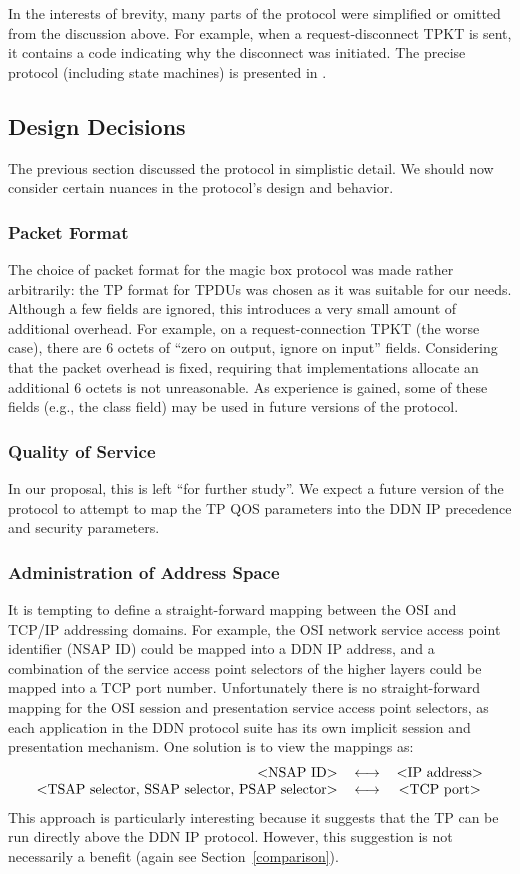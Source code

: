 In the interests of brevity,
many parts of the protocol were simplified or omitted from the discussion
above.
For example,
when a request-disconnect TPKT is sent,
it contains a code indicating why the disconnect was initiated.
The precise protocol (including state machines) is presented in
\cite{TSAP.on.TCP.old}.

\subsection	{Design Decisions}
The previous section discussed the protocol in simplistic detail.
We should now consider certain nuances in the protocol's design and behavior.

\subsubsection	{Packet Format}
The choice of packet format for the magic box protocol was made rather arbitrarily:
the TP format for TPDUs was chosen as it was suitable for our needs.
Although a few fields are ignored,
this introduces a very small amount of additional overhead.
For example,
on a request-connection TPKT (the worse case),
there are 6 octets of ``zero on output, ignore on input'' fields.
Considering that the packet overhead is fixed,
requiring that implementations allocate an additional 6 octets is not
unreasonable.
As experience is gained,
some of these fields (e.g., the class field) may be used in future versions
of the protocol.

\subsubsection	{Quality of Service}
In our proposal, this is left ``for further study''.
We expect a future version of the protocol to attempt to map the TP QOS
parameters into the DDN IP precedence and security parameters.

\subsubsection	{Administration of Address Space}
It is tempting to define a straight-forward mapping between the OSI and
TCP/IP addressing domains.
For example,
the OSI network service access point identifier (NSAP ID) could be mapped
into a DDN IP address,
and a combination of the service access point selectors of the higher layers
could be mapped into a TCP port number.
Unfortunately there is no straight-forward mapping for
the OSI session and presentation service access point selectors,
as each application in the DDN protocol suite has its own implicit session
and presentation mechanism.
One solution is to view the mappings as:
\[\begin{tabular}{rlc}
	$<$NSAP ID$>$&
			$\longleftrightarrow$&	$<$IP address$>$\\
	$<$TSAP  selector, SSAP selector, PSAP selector$>$&
			$\longleftrightarrow$&	$<$TCP port$>$
\end{tabular}\]
This approach is particularly interesting because it suggests that the
TP can be run directly above the DDN IP protocol.
However, this suggestion is not necessarily a benefit
(again see Section~\ref{comparison}).

